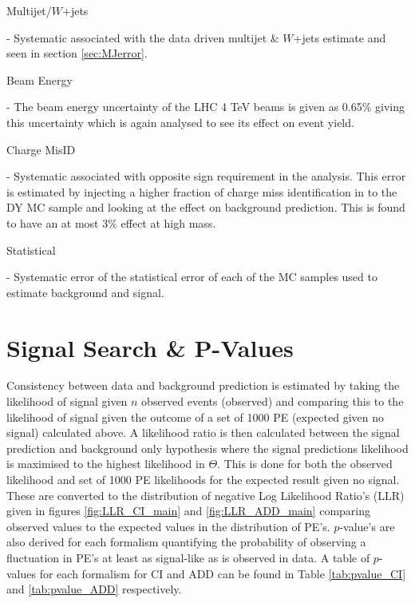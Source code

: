     {\bf\raggedright Multijet/$W$+jets} - Systematic associated with the data driven multijet \& $W$+jets estimate and seen in section \ref{sec:MJerror}. \\
    {\bf\raggedright Beam Energy} - The beam energy uncertainty of the LHC 4 TeV beams is given as 0.65\% giving this uncertainty which is again analysed to see its effect on event yield. \\
    {\bf\raggedright Charge MisID} - Systematic associated with opposite sign requirement in the analysis. This error is estimated by injecting a higher fraction of charge miss identification in to the DY MC sample and looking at the effect on background prediction. This is found to have an at most 3\% effect at high mass. \\
    {\bf\raggedright Statistical} - Systematic error of the statistical error of each of the MC samples used to estimate background and signal. \\







\section{Signal Search \& P-Values}

    Consistency between data and background prediction is estimated by taking the likelihood of signal given $n$ observed events (observed) and comparing this to the likelihood of signal given the outcome of a set of 1000 PE (expected given no signal) calculated above. A likelihood ratio is then calculated between the signal prediction and background only hypothesis where the signal predictions likelihood is maximised to the highest likelihood in $\Theta$. This is done for both the observed likelihood and set of 1000 PE likelihoods for the expected result given no signal. These are converted to the distribution of negative Log Likelihood Ratio's (LLR) given in figures \ref{fig:LLR_CI_main} and \ref{fig:LLR_ADD_main} comparing observed values to the expected values in the distribution of PE's. $p$-value's are also derived for each formalism quantifying the probability of observing a fluctuation in PE's at least as signal-like as is observed in data. A table of $p$-values for each formalism for CI and ADD can be found in Table \ref{tab:pvalue_CI} and \ref{tab:pvalue_ADD} respectively. 



